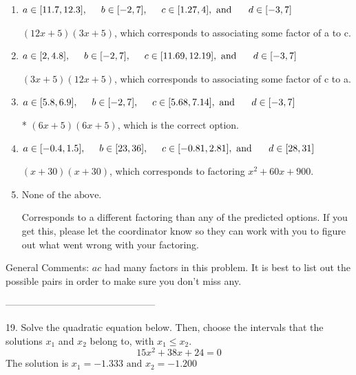 \documentclass{extbook}[14pt]
\begin{document}
\begin{enumerate}[label=\Alph*.] 
\item $ a \in [11.7, 12.3], \hspace*{5mm} b \in [-2, 7], \hspace*{5mm} c \in [1.27, 4], \text{ and } \hspace*{5mm} d \in [-3, 7] $ 

  $(12x + 5)(3x + 5)$, which corresponds to associating some factor of a to c. 
\item $ a \in [2, 4.8], \hspace*{5mm} b \in [-2, 7], \hspace*{5mm} c \in [11.69, 12.19], \text{ and } \hspace*{5mm} d \in [-3, 7] $ 

  $(3x + 5)(12x + 5)$, which corresponds to associating some factor of c to a. 
\item $ a \in [5.8, 6.9], \hspace*{5mm} b \in [-2, 7], \hspace*{5mm} c \in [5.68, 7.14], \text{ and } \hspace*{5mm} d \in [-3, 7] $ 

 * $(6x + 5)(6x + 5)$, which is the correct option. 
\item $ a \in [-0.4, 1.5], \hspace*{5mm} b \in [23, 36], \hspace*{5mm} c \in [-0.81, 2.81], \text{ and } \hspace*{5mm} d \in [28, 31] $ 

  $(x + 30)(x + 30)$, which corresponds to factoring $x^{2} +60 x + 900$. 
\item $ \text{None of the above.} $ 

  Corresponds to a different factoring than any of the predicted options. If you get this, please let the coordinator know so they can work with you to figure out what went wrong with your factoring. 
\end{enumerate} 
 
General Comments: $ac$ had many factors in this problem. It is best to list out the possible pairs in order to make sure you don't miss any.

-----------------------------------------------

19. Solve the quadratic equation below. Then, choose the intervals that the solutions $x_1$ and $x_2$ belong to, with $x_1 \leq x_2$.
\[ 15x^{2} +38 x + 24 = 0 \] 
The solution is $ x_1 = -1.333 \text{ and } x_2 = -1.200 $ 
\end{document}
